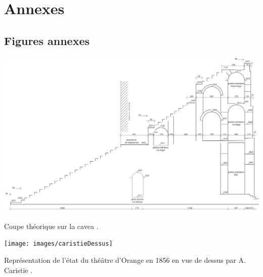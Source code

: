 

\chapter{Annexes} \label{Annexes}



\section*{Figures annexes}

\begin{figureth}
	\includegraphics[width=\linewidth]{images/CoupeCavea}
	\caption[Coupe théorique sur la \gls{cavea}.]{Coupe théorique sur la \gls{cavea} \cite[Pl. LX]{orangePl}.} 
	\label{coupeCavea} 
\end{figureth}

\begin{figureth}
	\texttt{[image: images/caristieDessus]}
	\caption[Vue de dessus par A. Caristie 1856.]{Représentation de l'état du théâtre d'Orange en 1856 en vue de dessus par A. Caristie \cite[Pl. I]{orangePl}.} 
	\label{caristieDessus} 
\end{figureth}
	
